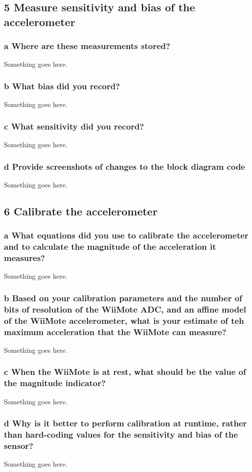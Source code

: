 \documentclass[10pt,a4paper]{article}
\begin{document}
  \subsection*{5 Measure sensitivity and bias of the accelerometer}
    \subsubsection*{a Where are these measurements stored?}
      Something goes here.
    \subsubsection*{b What bias did you record?}
      Something goes here.
    \subsubsection*{c What sensitivity did you record?}
      Something goes here.
    \subsubsection*{d Provide screenshots of changes to the block diagram code}
      Something goes here.
  \subsection*{6 Calibrate the accelerometer}
    \subsubsection*{a What equations did you use to calibrate the accelerometer and to calculate the magnitude of the acceleration it measures?}
      Something goes here.
    \subsubsection*{b Based on your calibration parameters and the number of bits of resolution of the WiiMote ADC, and an affine model of the WiiMote accelerometer, what is your estimate of teh maximum acceleration that the WiiMote can measure?}
      Something goes here.
    \subsubsection*{c When the WiiMote is at rest, what should be the value of the magnitude indicator?}
      Something goes here.
    \subsubsection*{d Why is it better to perform calibration at runtime, rather than hard-coding values for the sensitivity and bias of the sensor?}
      Something goes here.
\end{document}
